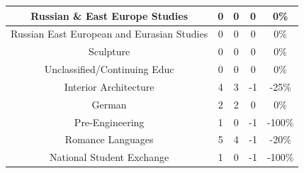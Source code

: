 \documentclass[10]{article}
\begin{document}
\begin{longtable}[c]{|ccccc|}
	\multicolumn{1}{|c|}{Russian \& East Europe Studies}             & \multicolumn{1}{c|}{0}                               & \multicolumn{1}{c|}{0}                                   & \multicolumn{1}{c|}{0}                  & 0\%                   \\ \hline
	\multicolumn{1}{|c|}{Russian East European and Eurasian Studies} & \multicolumn{1}{c|}{0}                               & \multicolumn{1}{c|}{0}                                   & \multicolumn{1}{c|}{0}                  & 0\%                   \\ \hline
	\multicolumn{1}{|c|}{Sculpture}                                  & \multicolumn{1}{c|}{0}                               & \multicolumn{1}{c|}{0}                                   & \multicolumn{1}{c|}{0}                  & 0\%                   \\ \hline
	\multicolumn{1}{|c|}{Unclassified/Continuing Educ}               & \multicolumn{1}{c|}{0}                               & \multicolumn{1}{c|}{0}                                   & \multicolumn{1}{c|}{0}                  & 0\%                   \\ \hline
	\multicolumn{1}{|c|}{Interior Architecture}                      & \multicolumn{1}{c|}{4}                               & \multicolumn{1}{c|}{3}                                   & \multicolumn{1}{c|}{-1}                 & -25\%                 \\ \hline
	\multicolumn{1}{|c|}{German}                                     & \multicolumn{1}{c|}{2}                               & \multicolumn{1}{c|}{2}                                   & \multicolumn{1}{c|}{0}                  & 0\%                   \\ \hline
	\multicolumn{1}{|c|}{Pre-Engineering}                            & \multicolumn{1}{c|}{1}                               & \multicolumn{1}{c|}{0}                                   & \multicolumn{1}{c|}{-1}                 & -100\%                \\ \hline
	\multicolumn{1}{|c|}{Romance Languages}                          & \multicolumn{1}{c|}{5}                               & \multicolumn{1}{c|}{4}                                   & \multicolumn{1}{c|}{-1}                 & -20\%                 \\ \hline
	\multicolumn{1}{|c|}{National Student Exchange}                  & \multicolumn{1}{c|}{1}                               & \multicolumn{1}{c|}{0}                                   & \multicolumn{1}{c|}{-1}                 & -100\%                \\ \hline

\end{longtable}
\end{document}
